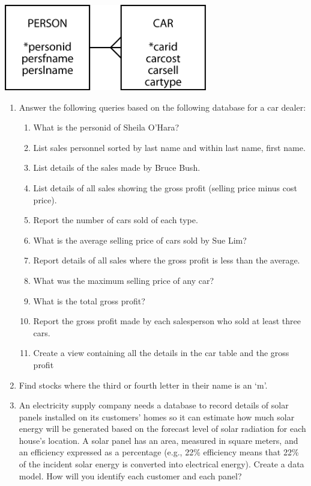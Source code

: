 \documentclass[
]{article}
\begin{document}
\includegraphics[width=3.48958in,height=\textheight]{Figures/Chapter 4/person-car.png}

\begin{enumerate}
\def\labelenumi{\arabic{enumi}.}
\setcounter{enumi}{7}
\item
  Answer the following queries based on the following database for a
  car dealer:

  \begin{enumerate}
  \def\labelenumii{\alph{enumii}.}
  \item
    What is the personid of Sheila O'Hara?
  \item
    List sales personnel sorted by last name and within last name,
    first name.
  \item
    List details of the sales made by Bruce Bush.
  \item
    List details of all sales showing the gross profit (selling
    price minus cost price).
  \item
    Report the number of cars sold of each type.
  \item
    What is the average selling price of cars sold by Sue Lim?
  \item
    Report details of all sales where the gross profit is less than
    the average.
  \item
    What was the maximum selling price of any car?
  \item
    What is the total gross profit?
  \item
    Report the gross profit made by each salesperson who sold at
    least three cars.
  \item
    Create a view containing all the details in the car table and
    the gross profit
  \end{enumerate}
\item
  Find stocks where the third or fourth letter in their name is an
  `m'.
\item
  An electricity supply company needs a database to record details of
  solar panels installed on its customers' homes so it can estimate
  how much solar energy will be generated based on the forecast level
  of solar radiation for each house's location. A solar panel has an
  area, measured in square meters, and an efficiency expressed as a
  percentage (e.g., 22\% efficiency means that 22\% of the incident
  solar energy is converted into electrical energy). Create a data
  model. How will you identify each customer and each panel?
\end{enumerate}
\end{document}
